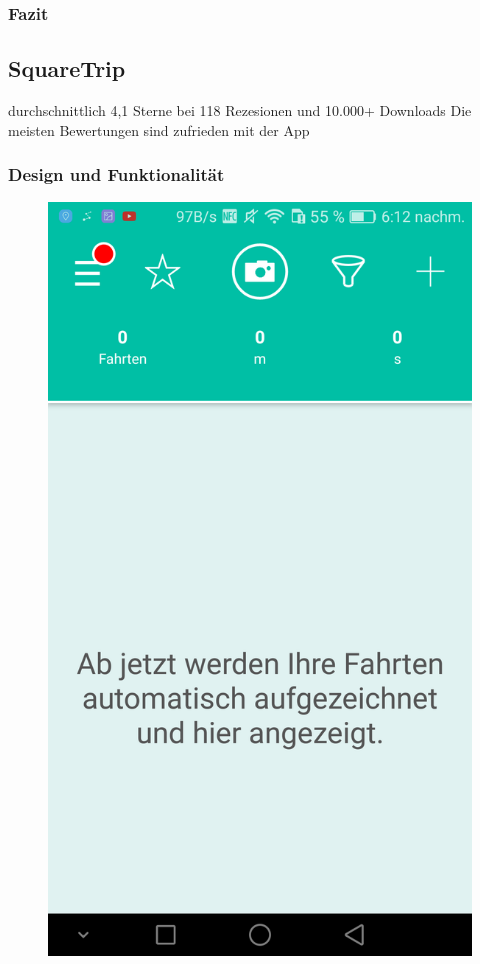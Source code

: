 \documentclass[a4paper]{article}
\begin{document}
\subsubsection{Fazit}

\subsection{SquareTrip}
durchschnittlich 4,1 Sterne bei 118 Rezesionen und 10.000+ Downloads
Die meisten Bewertungen sind zufrieden mit der App

\subsubsection{Design und Funktionalität}



\begin{figure}[H]%
    \begin{minipage}[b]{.4\linewidth} %
        \includegraphics[scale=0.14]{img/squ1}

\end{minipage}
\end{figure}
\end{document}
